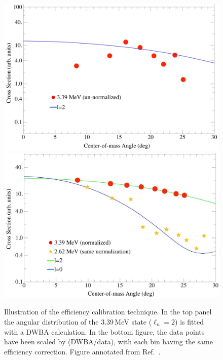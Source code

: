 \begin{figure}%
\centering
\includegraphics[height=0.45\textheight,width=\columnwidth,keepaspectratio]{More_Figures/b12_unnorm}\\
\includegraphics[height=0.45\textheight,width=0.98\columnwidth,keepaspectratio]{More_Figures/b12_norm}%
\caption[Illustration of the efficiency calibration technique]{Illustration of the efficiency calibration technique.  In the top panel the angular distribution of the 3.39\,MeV state ($\ell_n=2$) is fitted with a DWBA calculation.  In the bottom figure, the data points have been scaled by (DWBA/data), with each bin having the same efficiency correction. Figure annotated from Ref.~\cite{Schiffer_2009PC}.}%
\label{b12angdist2}%
\end{figure}

